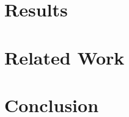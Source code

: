 %

\section{Results}
\label{sec:results}


\section{Related Work}
\label{sec:related}


\section{Conclusion}
\label{sec:conclusion}


%

%
%
%




